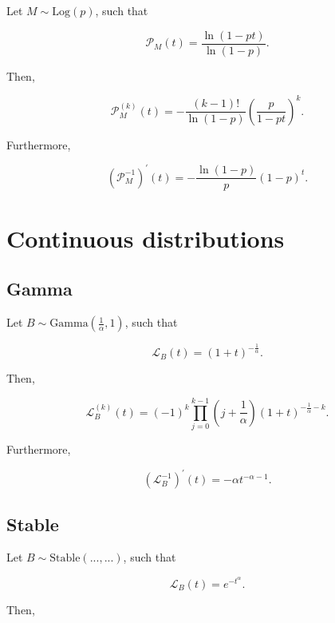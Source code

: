 \documentclass[11pt, english]{article}\usepackage[]{graphicx}\usepackage[]{color}
\begin{document}
Let $M \sim \mathrm{Log}(p)$, such that

$$ \mathcal{P}_M(t) = \frac{\ln(1 - pt)}{\ln(1 - p)}. $$

Then,

$$ \mathcal{P}_M^{(k)}(t) = -\frac{(k - 1)!}{\ln(1 - p)} \left(\frac{p}{1 - pt}\right)^k. $$

Furthermore,

$$ \left( \mathcal{P}_M^{-1} \right)^\prime (t) = -\frac{\ln(1 - p)}{p} (1 - p)^t. $$

\section{Continuous distributions}

\subsection{Gamma}

Let $B \sim \mathrm{Gamma}\left(\frac{1}{\alpha}, 1\right)$, such that

\begin{equation}
  \mathcal{L}_B(t) = (1 + t)^{-\frac{1}{\alpha}}.
\end{equation}

Then,

$$ \mathcal{L}_B^{(k)}(t) = (-1)^k \prod_{j = 0}^{k - 1} \left(j + \frac{1}{\alpha}\right) (1 + t)^{-\frac{1}{\alpha} - k}. $$

Furthermore,

$$ \left(\mathcal{L}_B^{-1}\right)^\prime(t) = -\alpha t^{-\alpha - 1}. $$

\subsection{Stable}

Let $B \sim \mathrm{Stable}(..., ...)$, such that

\begin{equation}
  \mathcal{L}_B(t) = e^{-t^\alpha}.
\end{equation}

Then,
\end{document}

